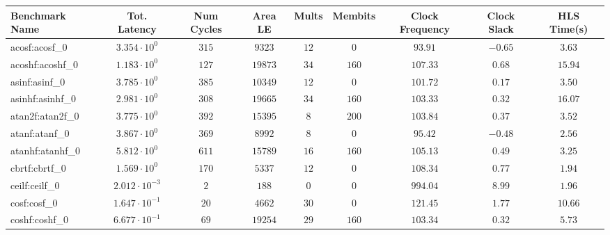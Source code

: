 \begin{tabular}{|l|c|c|c|c|c|c|c|c|}
\hline
Benchmark Name               & Tot. Latency            & Num Cycles & Area LE    & Mults   & Membits  & Clock Frequency & Clock Slack & HLS Time(s) \\
\hline
acosf:acosf\_0               & $ 3.354 \cdot 10^{0}  $ & $ 315    $ & $ 9323   $ & $ 12  $ & $ 0    $ & $ 93.91       $ & $ -0.65   $ & $ 3.63    $ \\
acoshf:acoshf\_0             & $ 1.183 \cdot 10^{0}  $ & $ 127    $ & $ 19873  $ & $ 34  $ & $ 160  $ & $ 107.33      $ & $ 0.68    $ & $ 15.94   $ \\
asinf:asinf\_0               & $ 3.785 \cdot 10^{0}  $ & $ 385    $ & $ 10349  $ & $ 12  $ & $ 0    $ & $ 101.72      $ & $ 0.17    $ & $ 3.50    $ \\
asinhf:asinhf\_0             & $ 2.981 \cdot 10^{0}  $ & $ 308    $ & $ 19665  $ & $ 34  $ & $ 160  $ & $ 103.33      $ & $ 0.32    $ & $ 16.07   $ \\
atan2f:atan2f\_0             & $ 3.775 \cdot 10^{0}  $ & $ 392    $ & $ 15395  $ & $ 8   $ & $ 200  $ & $ 103.84      $ & $ 0.37    $ & $ 3.52    $ \\
atanf:atanf\_0               & $ 3.867 \cdot 10^{0}  $ & $ 369    $ & $ 8992   $ & $ 8   $ & $ 0    $ & $ 95.42       $ & $ -0.48   $ & $ 2.56    $ \\
atanhf:atanhf\_0             & $ 5.812 \cdot 10^{0}  $ & $ 611    $ & $ 15789  $ & $ 16  $ & $ 160  $ & $ 105.13      $ & $ 0.49    $ & $ 3.25    $ \\
cbrtf:cbrtf\_0               & $ 1.569 \cdot 10^{0}  $ & $ 170    $ & $ 5337   $ & $ 12  $ & $ 0    $ & $ 108.34      $ & $ 0.77    $ & $ 1.94    $ \\
ceilf:ceilf\_0               & $ 2.012 \cdot 10^{-3} $ & $ 2      $ & $ 188    $ & $ 0   $ & $ 0    $ & $ 994.04      $ & $ 8.99    $ & $ 1.96    $ \\
cosf:cosf\_0                 & $ 1.647 \cdot 10^{-1} $ & $ 20     $ & $ 4662   $ & $ 30  $ & $ 0    $ & $ 121.45      $ & $ 1.77    $ & $ 10.66   $ \\
coshf:coshf\_0               & $ 6.677 \cdot 10^{-1} $ & $ 69     $ & $ 19254  $ & $ 29  $ & $ 160  $ & $ 103.34      $ & $ 0.32    $ & $ 5.73    $ \\

\end{tabular}
